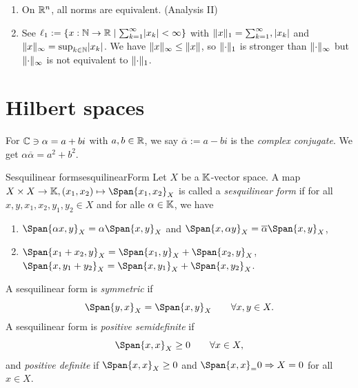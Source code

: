\documentclass[language=english]{../../Template/TemplateLecture}
\begin{document}
\begin{beispiel}
    \begin{enumerate}[$(i)$]
        \item On $\mathbb{R}^n$, all norms are equivalent. (Analysis II)
        \item See $\ell_1 := \{x: \mathbb{N} \to \mathbb{R} \mid \sum_{k = 1}^\infty \lvert x_k\rvert < \infty\}$ with $\lVert x\rVert_1 = \sum_{k = 1}^\infty, \lvert x_k\rvert$ and $\lVert x\rVert_\infty = \sup_{k \in \mathbb{N}} \lvert x_k\rvert$. We have $\lVert x\rVert_\infty \leq \lVert x\rVert$, so $\lVert\cdot\rVert_1$ is stronger than $\lVert\cdot\rVert_\infty$ but $\lVert\cdot\rVert_\infty$ is not equivalent to $\lVert\cdot\rVert_1$.
    \end{enumerate}
\end{beispiel}

\section{Hilbert spaces}
For $\mathbb{C} \ni \alpha = a + bi$ with $a, b \in \mathbb{R}$, we say $\overline{\alpha} := a - bi$ is the \emph{complex conjugate}. We get $\alpha \overline{\alpha} = a^2 + b^2$.

\begin{defi}{Sesquilinear form}{sesquilinearForm}
    Let $X$ be a $\mathbb{K}$-vector space. A map $X \times X \to \IK, (x_1, x_2) \mapsto \Span{x_1,x_2}_X$ is called a \emph{sesquilinear form} if for all $x, y, x_1, x_2, y_1, y_2 \in X$ and for alle $\alpha \in \mathbb{K}$, we have 
    \begin{enumerate}[$(i)$]
        \item $\Span{\alpha x, y}_X = \alpha \Span{x,y}_X$ and $\Span{x, \alpha y}_X = \overline{\alpha}\Span{x,y}_X$,
        \item $\Span{x_1 + x_2,y}_X = \Span{x_1,y}_X + \Span{x_2,y}_X$, $\Span{x,y_1 + y_2}_X = \Span{x,y_1}_X + \Span{x,y_2}_X$.
    \end{enumerate}
    A sesquilinear form is \emph{symmetric} if 
    \begin{equation}
        \Span{y,x}_X = \Span{x,y}_X \quad \quad \forall x,y \in X.
    \end{equation}
    A sesquilinear form is \emph{positive semidefinite} if 
    \begin{equation}
        \Span{x,x}_X \geq 0 \quad \quad \forall x \in X,
    \end{equation}
    and \emph{positive definite} if $\Span{x,x}_X \geq 0$ and $\Span{x,x}_ = 0 \Rightarrow X = 0$ for all $x \in X$.
\end{defi}
\end{document}
